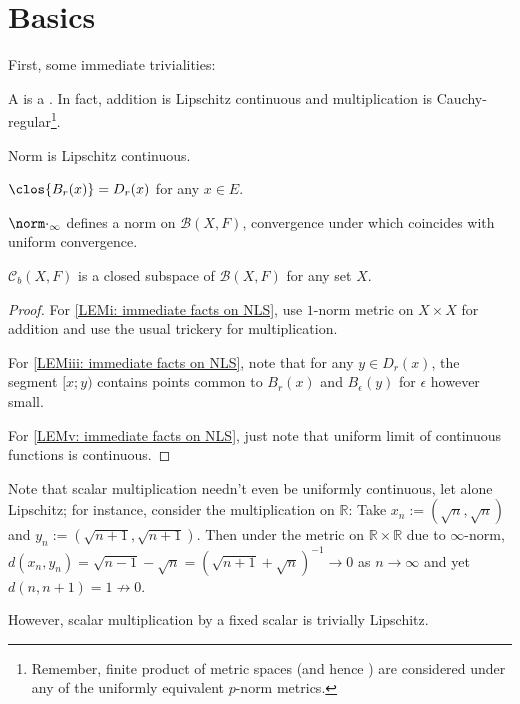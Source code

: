 \section{Basics}

	First, some immediate trivialities:

	\begin{lem}\label{LEM: immediate facts on NLS}
		\leavevmode
		\begin{mylist}
			\item\label{LEMi: immediate facts on NLS} A \NLS is a \TVS. In fact, addition is Lipschitz continuous and multiplication is Cauchy-regular\footnote{
				Remember, finite product of metric spaces (and hence ) are considered under any of the uniformly equivalent $p$-norm metrics.
			}.
			
			\item Norm is Lipschitz continuous.
			
			\item\label{LEMiii: immediate facts on NLS} $\clos{B_r(x)} = D_r(x)$ for any $x\in E$.
			
			\item $\norm\cdot_\infty$ defines a norm on $\mathcal B(X, F)$, convergence under which coincides with uniform convergence.
			
			\item\label{LEMv: immediate facts on NLS} $\mathcal C_b(X, F)$ is a closed subspace of $\mathcal B(X, F)$ for any set $X$.
		\end{mylist}
	\end{lem}
	
	\begin{proof}
		For \ref{LEMi: immediate facts on NLS}, use $1$-norm metric on $X\times X$ for addition and use the usual trickery for multiplication.
		
		For \ref{LEMiii: immediate facts on NLS}, note that for any $y\in D_r(x)$, the segment $[x; y)$ contains points common to $B_r(x)$ and $B_\epsilon(y)$ for $\epsilon$ however small.
		
		For \ref{LEMv: immediate facts on NLS}, just note that uniform limit of continuous functions is continuous.
	\end{proof}
	
	\begin{rmk}
		Note that scalar multiplication needn't even be uniformly continuous, let alone Lipschitz; for instance, consider the multiplication on $\mathbb R$: Take $x_n := (\sqrt n, \sqrt n)$ and $y_n := (\sqrt{n + 1}, \sqrt{n + 1})$. Then under the metric on $\mathbb R\times\mathbb R$ due to $\infty$-norm, $d(x_n, y_n) = \sqrt{n - 1} - \sqrt n = (\sqrt{n + 1} + \sqrt n)^{-1}\to 0$ as $n\to \infty$ and yet $d(n, n + 1) = 1\not\to 0$.
		
		However, scalar multiplication by a fixed scalar is trivially Lipschitz.
	\end{rmk}
	
